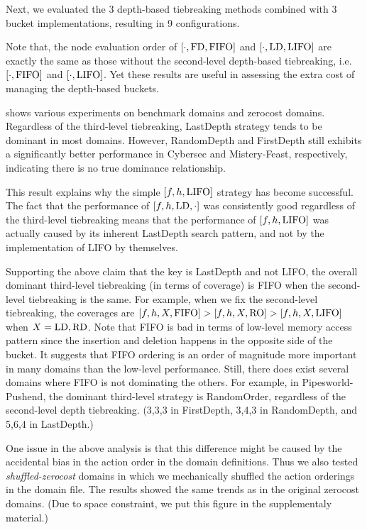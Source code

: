Next, we evaluated the 3 depth-based tiebreaking methods combined with 3
bucket implementations, resulting in 9 configurations.

Note that, the node evaluation order of $[\cdot,\mbox{FD},\mbox{FIFO}]$ and $[\cdot,\mbox{LD},\mbox{LIFO}]$
are exactly the same as those without the second-level
depth-based tiebreaking, i.e.\ $[\cdot,\mbox{FIFO}]$ and $[\cdot,\mbox{LIFO}]$.
Yet these results are useful in assessing the extra cost of managing the
depth-based buckets.

 shows various experiments on benchmark domains and
zerocost domains. Regardless of the third-level tiebreaking, LastDepth
strategy tends to be dominant in most domains. However, RandomDepth and
FirstDepth still exhibits a significantly better performance in Cybersec
and Mistery-Feast, respectively, indicating there is no true dominance relationship.

This result explains why the simple $[f,h,\mbox{LIFO}]$ strategy has become
successful.  The fact that the performance of $[f,h,\mbox{LD},\cdot]$ was
consistently good regardless of the third-level tiebreaking means that
the performance of $[f,h,\mbox{LIFO}]$ was actually caused by its inherent
LastDepth search pattern, and not by the implementation of LIFO
by themselves.

Supporting the above claim that the key is LastDepth and not LIFO, the
overall dominant third-level tiebreaking (in terms of coverage) is FIFO
when the second-level tiebreaking is the same.  For example, when we fix
the second-level tiebreaking, the coverages are
$[f,h,X,\mbox{FIFO}]>[f,h,X,\mbox{RO}]>[f,h,X,\mbox{LIFO}]$ when $X=\mbox{LD},\mbox{RD}$.
% 
Note that FIFO is bad in terms of low-level memory access
pattern since the insertion and deletion happens in the opposite side of
the bucket. It suggests that FIFO ordering is an order of magnitude
more important in many domains than the low-level performance.
% 
Still, there does exist several domains where FIFO is not dominating
the others.
For example, in Pipesworld-Pushend, the dominant third-level strategy is
RandomOrder, regardless of the second-level depth tiebreaking.
(3,3,3 in FirstDepth, 3,4,3 in RandomDepth, and 5,6,4 in LastDepth.)

% 

One issue in the above analysis is that this difference might
be caused by the accidental bias in the action order in the
domain definitions.
Thus we also tested \emph{shuffled-zerocost} domains
in which we mechanically shuffled the action orderings in the
domain file. The results showed the same trends as in the original
zerocost domains. (Due to space constraint, we put this figure in the
supplementaly material.)

